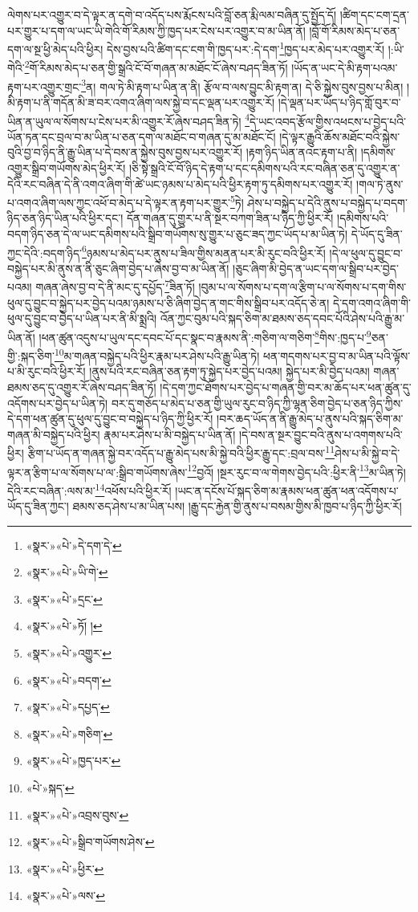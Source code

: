 ལེགས་པར་འགྱུར་བ་དེ་ལྟར་ན་དགེ་བ་འདོད་པས་རྨོངས་པའི་བློ་ཅན་རྨི་ལམ་བཞིན་དུ་སྤྱོད་དོ། །ཚིག་དང་ངག་དྲན་པར་གྱུར་པ་དག་ལ་ཡང་ཡི་གེའི་གོ་རིམས་ཀྱི་ཁྱད་པར་ངེས་པར་འགྱུར་བ་མ་ཡིན་ནོ། །བློ་གོ་རིམས་མེད་པ་ཅན་དག་ལ་སྔ་ཕྱི་མེད་པའི་ཕྱིར། དེས་བྱས་པའི་ཚིག་དང་ངག་གི་ཁྱད་པར་:དེ་དག་\footnote{«སྣར་»«པེ་»དེ་དག་དེ་}ཁྱད་པར་མེད་པར་འགྱུར་རོ། །:ཡི་གེའི་\footnote{«སྣར་»«པེ་»ཡི་གེ་}གོ་རིམས་མེད་པ་ཅན་གྱི་སྒྲའི་ངོ་བོ་གཞན་མ་མཐོང་ངོ་ཞེས་བཤད་ཟིན་ཏོ། །ཡོད་ན་ཡང་དེ་མི་རྟག་པའམ་རྟག་པར་འགྱུར་གྲང་\footnote{«སྣར་»«པེ་»དྲང་}ན། གལ་ཏེ་མི་རྟག་པ་ཡིན་ན་ནི། རྩོལ་བ་ལས་བྱུང་མི་རྟག་ན། དེ་ཅི་སྐྱེས་བུས་བྱས་པ་མིན། །མི་རྟག་པ་ནི་གདོན་མི་ཟ་བར་འགའ་ཞིག་ལས་སྐྱེ་བ་དང་ལྡན་པར་འགྱུར་རོ། །དེ་ལྡན་པར་ཡོད་པ་ཉིད་གློ་བུར་བ་ཡིན་ན་ཡུལ་ལ་སོགས་པ་ངེས་པར་མི་འགྱུར་རོ་ཞེས་བཤད་ཟིན་ཏེ། \footnote{«སྣར་»«པེ་»ཏོ། ། }དེ་ཡང་འབད་རྩོལ་གྱིས་འཕངས་པ་བྱེད་པའི་ཡོན་ཏན་དང་བྲལ་བ་མ་ཡིན་པ་ཅན་དག་ལ་མཐོང་བ་གཞན་དུ་མ་མཐོང་ངོ། །དེ་ལྟར་རྒྱུའི་ཆོས་མཐོང་བའི་སྐྱེས་བུའི་བྱ་བ་ཉིད་ནི་རྒྱུ་ཡིན་པ་དེ་བས་ན་སྐྱེས་བུས་བྱས་པར་འགྱུར་རོ། །རྟག་ཉིད་ཡིན་ནའང་རྟག་པ་ནི། །དམིགས་འགྱུར་སྒྲིབ་གཡོགས་མེད་ཕྱིར་རོ། །ཅི་སྟེ་སྒྲའི་ངོ་བོ་ཉིད་དེ་རྟག་པ་དང་དམིགས་པའི་རང་བཞིན་ཅན་དུ་འགྱུར་ན་དེའི་རང་བཞིན་དེ་ནི་འགའ་ཞིག་གི་ཚེ་ཡང་ཉམས་པ་མེད་པའི་ཕྱིར་རྟག་ཏུ་དམིགས་པར་འགྱུར་རོ། །གལ་ཏེ་ནུས་པ་འགའ་ཞིག་ལས་ཀྱང་འཕོ་བ་མེད་པ་དེ་ལྟར་ན་རྟག་པར་གྱུར་\footnote{«སྣར་»«པེ་»འགྱུར་}ཏེ། ཤེས་པ་བསྐྱེད་པ་དེའི་ནུས་པ་བསྐྱེད་པ་བདག་ཉིད་ཅན་ཉིད་ཡིན་པའི་ཕྱིར་དང་། དོན་གཞན་དུ་གྱུར་པ་ནི་སྔར་བཀག་ཟིན་པ་ཉིད་ཀྱི་ཕྱིར་རོ། །དམིགས་པའི་བདག་ཉིད་ཅན་དེ་ལ་ཡང་དམིགས་པའི་སྒྲིབ་གཡོགས་སུ་གྱུར་པ་ཅུང་ཟད་ཀྱང་ཡོད་པ་མ་ཡིན་ཏེ། དེ་ཡོད་དུ་ཟིན་ཀྱང་དེའི་:བདག་ཉིད་\footnote{«སྣར་»«པེ་»བདག་}ཉམས་པ་མེད་པར་ནུས་པ་ཟིལ་གྱིས་མནན་པར་མི་རུང་བའི་ཕྱིར་རོ། །དེ་ལ་ཕུལ་དུ་བྱུང་བ་བསྐྱེད་པར་མི་ནུས་ན་ནི་ཅུང་ཞིག་བྱེད་པ་ཞེས་བྱ་བ་མ་ཡིན་ནོ། །ཅུང་ཞིག་མི་བྱེད་ན་ཡང་དག་ལ་སྒྲིབ་པར་བྱེད་པའམ། གཞན་ཞེས་བྱ་བ་དེ་ནི་མང་དུ་དཔྱོད་\footnote{«སྣར་»«པེ་»དཔྱད་}ཟིན་ཏོ། །བུམ་པ་ལ་སོགས་པ་དག་ལ་རྩིག་པ་ལ་སོགས་པ་དག་གིས་ཕུལ་དུ་བྱུང་བ་སྐྱེད་པར་བྱེད་པའམ་ཉམས་པ་ཅི་ཞིག་བྱེད་ན་གང་གིས་སྒྲིབ་པར་འདོད་ཅེ་ན། དེ་དག་འགའ་ཞིག་གི་ཕུལ་དུ་བྱུང་བ་བྱེད་པ་ཡིན་པར་ནི་མི་སྨྲའི། འོན་ཀྱང་བུམ་པའི་སྐད་ཅིག་མ་ཐམས་ཅད་དབང་པོའི་ཤེས་པའི་རྒྱུ་མ་ཡིན་ནོ། །ཕན་ཚུན་འདུས་པ་ཡུལ་དང་དབང་པོ་དང་སྣང་བ་རྣམས་ནི་:གཅིག་ལ་གཅིག་\footnote{«སྣར་»«པེ་»གཅིག་}གིས་:ཁྱད་པ་\footnote{«སྣར་»«པེ་»ཁྱད་པར་}ཅན་གྱི་:སྐད་ཅིག་\footnote{«པེ་»སྐད་}མ་གཞན་བསྐྱེད་པའི་ཕྱིར་རྣམ་པར་ཤེས་པའི་རྒྱུ་ཡིན་ཏེ། ཕན་གདགས་པར་བྱ་བ་མ་ཡིན་པའི་ལྟོས་པ་མི་རུང་བའི་ཕྱིར་རོ། །ནུས་པའི་རང་བཞིན་ཅན་རྟག་ཏུ་སྐྱེད་པར་བྱེད་པའམ། སྐྱེད་པར་མི་བྱེད་པའམ། གཞན་ཐམས་ཅད་དུ་འགྱུར་རོ་ཞེས་བཤད་ཟིན་ཏོ། །དེ་དག་ཀྱང་ཐོགས་པར་བྱེད་པ་གཞན་གྱི་བར་མ་ཆོད་པར་ཕན་ཚུན་དུ་འདོགས་པར་བྱེད་པ་ཡིན་ཏེ། བར་དུ་གཅོད་པ་མེད་པ་ཅན་གྱི་ཡུལ་རུང་བ་ཉིད་ཀྱི་ལྷན་ཅིག་བྱེད་པ་ཅན་ཉིད་ཀྱིས་དེ་དག་ཕན་ཚུན་དུ་ཕུལ་དུ་བྱུང་བ་བསྐྱེད་པ་ཉིད་ཀྱི་ཕྱིར་རོ། །བར་ཆད་ཡོད་ན་ནི་རྒྱུ་མེད་པ་ནུས་པའི་སྐད་ཅིག་མ་གཞན་མི་བསྐྱེད་པའི་ཕྱིར། རྣམ་པར་ཤེས་པ་མི་བསྐྱེད་པ་ཡིན་ནོ། །དེ་བས་ན་སྔར་བྱུང་བའི་ནུས་པ་འགགས་པའི་ཕྱིར། རྩིག་པ་ཡོད་ན་གཞན་སྐྱེ་བར་འདོད་པ་རྒྱུ་མེད་པས་མི་སྐྱེ་བའི་ཕྱིར་རྒྱུ་དང་:བྲལ་བས་\footnote{«སྣར་»«པེ་»འབྲས་བུས་}ཤེས་པ་མི་སྐྱེ་བ་དེ་ལྟར་ན་རྩིག་པ་ལ་སོགས་པ་ལ་:སྒྲིབ་གཡོགས་ཞེས་\footnote{«སྣར་»«པེ་»སྒྲིབ་གཡོགས་ཤེས་}བྱའོ། །སྔར་རུང་བ་ལ་གེགས་བྱེད་པའི་:ཕྱིར་ནི་\footnote{«སྣར་»«པེ་»ཕྱིར་}མ་ཡིན་ཏེ། དེའི་རང་བཞིན་:ལས་མ་\footnote{«སྣར་»«པེ་»ལས་}འཕོས་པའི་ཕྱིར་རོ། །ཡང་ན་དངོས་པོ་སྐད་ཅིག་མ་རྣམས་ཕན་ཚུན་ཕན་འདོགས་པ་ཡོད་དུ་ཟིན་ཀྱང་། ཐམས་ཅད་ཤེས་པ་མ་ཡིན་པས། །རྒྱུ་དང་རྐྱེན་གྱི་ནུས་པ་བསམ་གྱིས་མི་ཁྱབ་པ་ཉིད་ཀྱི་ཕྱིར་རོ། 